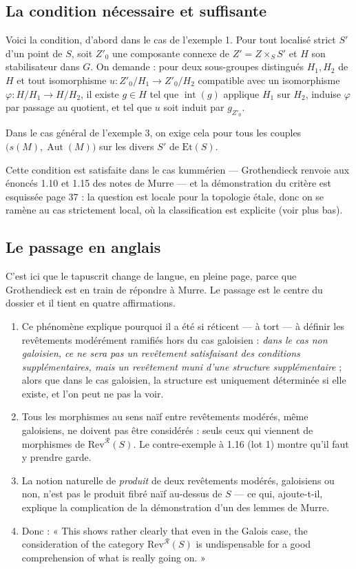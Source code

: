 \documentclass[11pt,a4paper]{article}
\begin{document}
\subsection*{La condition nécessaire et suffisante}

Voici la condition, d'abord dans le cas de l'exemple 1. Pour tout localisé
strict $S'$ d'un point de $S$, soit $Z'_{0}$ une composante connexe de
$Z' = Z \times_{S} S'$ et $H$ son stabilisateur dans $G$. On demande : pour
deux sous-groupes distingués $H_{1}, H_{2}$ de $H$ et tout isomorphisme
$u : Z'_{0}/H_{1} \to Z'_{0}/H_{2}$ compatible avec un isomorphisme
$\varphi : H/H_{1} \to H/H_{2}$, il existe $g \in H$ tel que
$\operatorname{int}(g)$ applique $H_{1}$ sur $H_{2}$, induise $\varphi$ par
passage au quotient, et tel que $u$ soit induit par $g_{Z'_{0}}$.

Dans le cas général de l'exemple 3, on exige cela pour tous les couples
$\bigl(s(M), \operatorname{Aut}(M)\bigr)$ sur les divers $S'$ de
$\mathrm{Et}(S)$.

Cette condition est satisfaite dans le cas kummérien --- Grothendieck renvoie
aux énoncés 1.10 et 1.15 des notes de Murre --- et la démonstration du critère
est esquissée page 37 : la question est locale pour la topologie étale, donc on
se ramène au cas strictement local, où la classification est explicite (voir
plus bas).

\subsection*{Le passage en anglais}

C'est ici que le tapuscrit change de langue, en pleine page, parce que
Grothendieck est en train de répondre à Murre. Le passage est le centre du
dossier et il tient en quatre affirmations.

\begin{enumerate}
  \item Ce phénomène explique pourquoi il a été si réticent --- à tort ---
    à définir les revêtements modérément ramifiés hors du cas galoisien :
    \emph{dans le cas non galoisien, ce ne sera pas un revêtement satisfaisant
    des conditions supplémentaires, mais un revêtement muni d'une structure
    supplémentaire} ; alors que dans le cas galoisien, la structure est
    uniquement déterminée si elle existe, et l'on peut ne pas la voir.
  \item Tous les morphismes au sens naïf entre revêtements modérés, même
    galoisiens, ne doivent pas être considérés : seuls ceux qui viennent de
    morphismes de $\mathrm{Rev}^{\mathcal{R}}(S)$. Le contre-exemple à 1.16
    (lot 1) montre qu'il faut y prendre garde.
  \item La notion naturelle de \emph{produit} de deux revêtements modérés,
    galoisiens ou non, n'est pas le produit fibré naïf au-dessus de $S$ ---
    ce qui, ajoute-t-il, explique la complication de la démonstration d'un des
    lemmes de Murre.
  \item Donc : « This shows rather clearly that even in the Galois case, the
    consideration of the category $\mathrm{Rev}^{\mathcal{R}}(S)$ is
    undispensable for a good comprehension of what is really going on. »
\end{enumerate}
\end{document}

